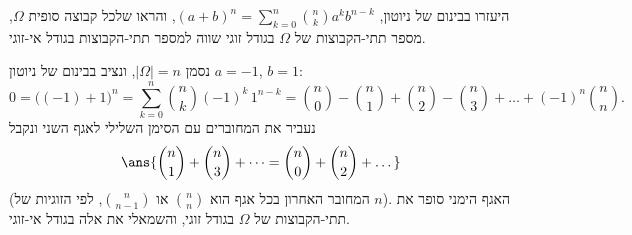 היעזרו בבינום של ניוטון, $(a+b)^n=\sum_{k=0}^n\binom nka^kb^{n-k}$, והראו שלכל קבוצה סופית $\Omega$, מספר תתי-הקבוצות של $\Omega$ בגודל זוגי שווה למספר תתי-הקבוצות בגודל אי-זוגי.
\begin{solbox}
נסמן $|\Omega|=n$, ונציב בבינום של ניוטון $a=-1$, $b=1$:
\[
0=\big((-1)+1\big)^n=\sum_{k=0}^n\binom nk(-1)^k\,1^{n-k}=\binom n0-\binom n1+\binom n2-\binom n3+\dots+(-1)^n\binom nn.
\]
נעביר את המחוברים עם הסימן השלילי לאגף השני ונקבל
\[
\ans{\binom n1+\binom n3+\dots=\binom n0+\binom n2+\dots}
\]
(המחובר האחרון בכל אגף הוא $\binom nn$ או $\binom n{n-1}$, לפי הזוגיות של $n$). האגף הימני סופר את תתי-הקבוצות של $\Omega$ בגודל זוגי, והשמאלי את אלה בגודל אי-זוגי.
\end{solbox}
